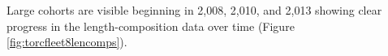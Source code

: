 \documentclass[11pt,
  english,
  a4paper,
]{article}
\begin{document}

Large cohorts are visible beginning in 2,008, 2,010, and 2,013 showing clear progress in the length-composition data over time (Figure \ref{fig:torcfleet8lencomps}).

\leavevmode\tagmcend\tagstructend\par

\end{document}

